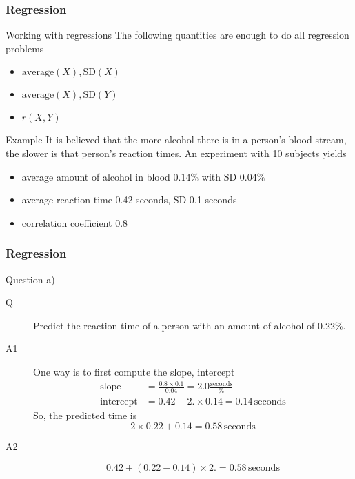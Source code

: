\documentclass[handout]{beamer}
\begin{document}
   \begin{frame} \frametitle{Regression}

   \begin{block}
   {Working with regressions}
   The following quantities are enough to do all
   regression problems
   \begin{itemize}
   \item $\text{average}(X), \text{SD}(X)$
   \item $\text{average}(X), \text{SD}(Y)$
   \item $r(X,Y)$
   \end{itemize}
   \end{block}

   \begin{block}
   {Example}
   It is believed that the more alcohol there is in a person's blood
   stream, the slower is that person's reaction times.
   An experiment with 10 subjects yields
   \begin{itemize}
   \item average amount of alcohol in blood $0.14\%$ with SD $0.04\%$
   \item average reaction time 0.42 seconds, SD 0.1 seconds
   \item correlation coefficient 0.8
   \end{itemize}
   \end{block}
   \end{frame}


   \begin{frame} \frametitle{Regression}

   \begin{block}
   {Question a)}
   \begin{description}
   \item[Q] Predict the reaction time of a person with an amount
   of alcohol of 0.22\%.
   \item[A1] One way is to first compute the slope, intercept
   $$
   \begin{aligned}
   \text{slope} &= \frac{0.8 \times 0.1}{0.04} = 2.0 \frac{\text{seconds}}{\%}     \\
   \text{intercept} &= 0.42 - 2. \times 0.14 = 0.14 \, \text{seconds}
   \end{aligned}
   $$
   So, the predicted time is
   $$
   2 \times 0.22 + 0.14 = 0.58 \, \text{seconds}
   $$
   \item[A2]
   $$
   0.42 + (0.22 - 0.14) \times 2. = 0.58 \, \text{seconds}
   $$
   \end{description}
   \end{block}
   \end{frame}
\end{document}
